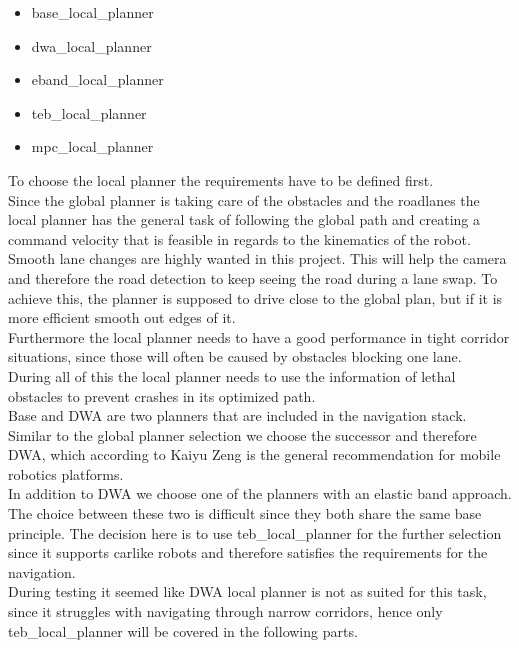 \begin{itemize}
	\item base\_local\_planner
	\item dwa\_local\_planner
	\item eband\_local\_planner
	\item teb\_local\_planner
	\item mpc\_local\_planner
\end{itemize}\cite{navcore}

To choose the local planner the requirements have to be defined first.\\

Since the global planner is taking care of the obstacles and the roadlanes the local planner has the general task of following the global path and creating a command velocity that is feasible in regards to the kinematics of the robot.\\

Smooth lane changes are highly wanted in this project. This will help the camera and therefore the road detection to keep seeing the road during a lane swap. To achieve this, the planner is supposed to drive close to the global plan, but if it is more efficient smooth out edges of it.\\
Furthermore the local planner needs to have a good performance in tight corridor situations, since those will often be caused by obstacles blocking one lane.\\

During all of this the local planner needs to use the information of lethal obstacles to prevent crashes in its optimized path.\\


Base and DWA are two planners that are included in the navigation stack. Similar to the global planner selection we choose the successor and therefore DWA, which according to Kaiyu Zeng is the general recommendation for mobile robotics platforms\cite{navtuningguide}.\\


In addition to DWA we choose one of the planners with an elastic band approach. The choice between these two is difficult since they both share the same base principle. The decision here is to use teb\_local\_planner for the further selection since it supports carlike robots and therefore satisfies the requirements for the navigation.\\

During testing it seemed like DWA local planner is not as suited for this task, since it struggles with navigating through narrow corridors, hence only teb\_local\_planner will be covered in the following parts.

